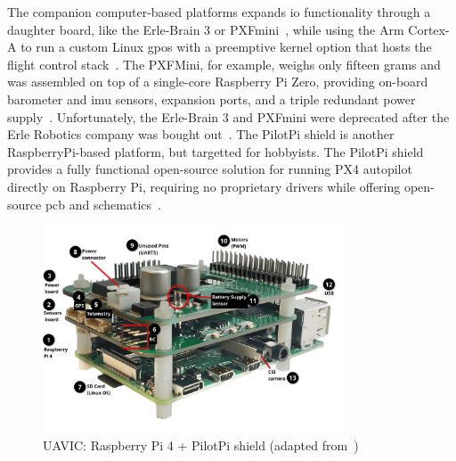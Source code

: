 The companion computer-based platforms expands \gls{io} functionality through a daughter
board, like the Erle-Brain 3 or PXFmini~\cite{ebeidUAVPlatformsSurvey2017}, while using the Arm Cortex-A to run a
custom Linux \gls{gpos} with a preemptive kernel option that hosts the flight
control stack~\cite{erle-brain}. The PXFMini, for example, weighs only fifteen
grams and was assembled on top of a single-core Raspberry Pi Zero, providing
on-board barometer and \gls{imu} sensors, expansion ports, and a triple
redundant power supply~\cite{pxfmini}. Unfortunately, the Erle-Brain 3 and PXFmini were
deprecated after the Erle Robotics company was bought out~\cite{pxfmini-deprec}.
The PilotPi shield is another RaspberryPi-based platform, but targetted for hobbyists. The PilotPi shield provides a fully functional open-source
solution for running PX4 autopilot directly on Raspberry Pi, requiring no
proprietary drivers while offering open-source \gls{pcb} and
schematics~\cite{px4-pilotpi}.

\begin{figure}[!hbt]
  \centering
  \includegraphics[width=0.8\textwidth]{./img/png/pilotpi-annotated} 
  \caption[UAVIC: Raspberry Pi 4 + PilotPi shield]{UAVIC: Raspberry Pi 4 +
    PilotPi shield (adapted from~\cite{px4-pilotpi})\footnotemark}%
  \label{fig:pilotpi-annot}
\end{figure}
%
%

